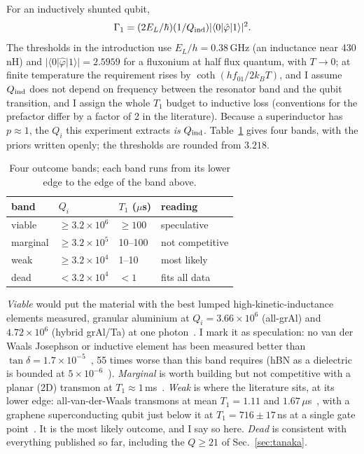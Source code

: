 \documentclass[aps,prb,reprint,superscriptaddress,longbibliography]{revtex4-2}
\begin{document}
For an inductively shunted qubit,
\[
\Gamma_1 = (2E_L/\hbar)(1/Q_{\rm ind})|\langle 0|\hat\varphi|1\rangle|^2 .
\]
The thresholds in the
introduction use $E_L/h = 0.38$\,GHz (an inductance near 430\,nH) and
$|\langle 0|\hat\varphi|1\rangle| = 2.5959$ for a fluxonium at half flux
quantum, with $T \to 0$; at finite temperature the requirement rises by
$\coth(hf_{01}/2k_BT)$, and I assume $Q_{\rm ind}$ does not depend on
frequency between the resonator band and the qubit transition, and I
assign the whole $T_1$ budget to inductive loss (conventions for the
prefactor differ by a factor of 2 in the literature). Because a
superinductor has $p \approx 1$, the $Q_i$ this experiment extracts
\emph{is} $Q_{\rm ind}$. Table~\ref{tab:bands} gives four bands, with
the priors written openly; the thresholds are rounded from $3.218$.

\begin{table}[!tbp]
\caption{\label{tab:bands}Four outcome bands; each band runs from its
lower edge to the edge of the band above.}
\begin{ruledtabular}
\begin{tabular}{llll}
band & $Q_i$ & $T_1$ ($\mu$s) & reading \\
\hline
viable   & $\geq 3.2 \times 10^{6}$ & $\geq 100$ & speculative \\
marginal & $\geq 3.2 \times 10^{5}$ & 10--100 & not competitive \\
weak     & $\geq 3.2 \times 10^{4}$ & 1--10 & most likely \\
dead     & $< 3.2 \times 10^{4}$ & $<1$ & fits all data \\
\end{tabular}
\end{ruledtabular}
\end{table}

\emph{Viable} would put the material with the best lumped
high-kinetic-inductance elements measured, granular aluminium at $Q_i =
3.66 \times 10^{6}$ (all-grAl) and $4.72 \times 10^{6}$ (hybrid
grAl/Ta) at one photon~\cite{Gupta2025}. I mark it as speculation: no
van der Waals Josephson or inductive element has been measured better
than $\tan\delta = 1.7 \times 10^{-5}$~\cite{Balgley2025}, 55 times
worse than this band requires (hBN as a dielectric is bounded at $5
\times 10^{-6}$~\cite{Wang2022}). \emph{Marginal} is worth building but
not competitive with a planar (2D) transmon at $T_1 \approx 1$\,ms~\cite{Bland2025}.
\emph{Weak} is where the literature sits, at its lower edge:
all-van-der-Waals transmons at mean $T_1 = 1.11$ and
$1.67\,\mu$s~\cite{Balgley2025}, with a graphene superconducting qubit
just below it at $T_1 = 716 \pm 17$\,ns at a single gate
point~\cite{Aparicio2025}. It is the most likely outcome, and I say so
here. \emph{Dead} is consistent with everything published so
far, including the $Q \geq 21$ of Sec.~\ref{sec:tanaka}.
\end{document}
